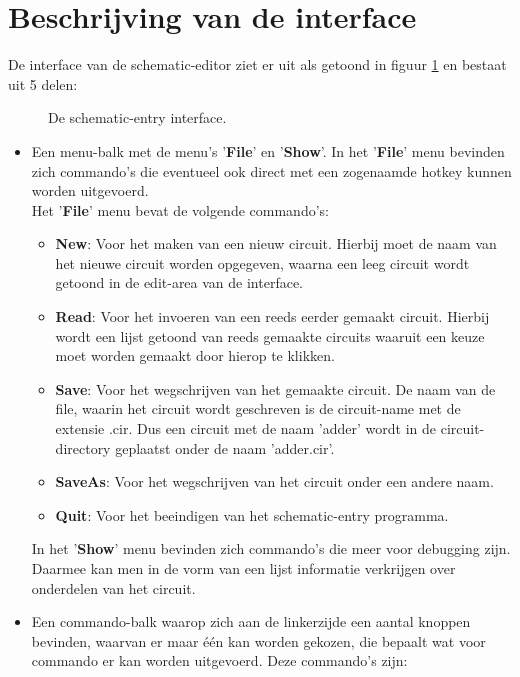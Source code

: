 \section{Beschrijving van de interface}
De interface van de schematic-editor ziet er uit als getoond in figuur \ref{schen-window}
en bestaat uit 5 delen:
\begin{figure}[htb]
  \centerline{}
  \caption{De schematic-entry interface.}
  \label{schen-window}
\end{figure}
\begin{itemize}
\item Een menu-balk met de menu's '{\bf File}' en '{\bf Show}'.
In het '{\bf File}' menu bevinden zich commando's die eventueel ook direct met
een zogenaamde hotkey kunnen worden uitgevoerd.\\
Het '{\bf File}' menu bevat de volgende commando's:
   \begin{itemize}
   \item {\bf New}: Voor het maken van een nieuw circuit. Hierbij moet de naam
               van het nieuwe circuit worden opgegeven, waarna een leeg
               circuit wordt getoond in de edit-area van de interface.
   \item {\bf Read}: Voor het invoeren van een reeds eerder gemaakt circuit.
               Hierbij wordt een lijst getoond van reeds gemaakte circuits
               waaruit een keuze moet worden gemaakt door hierop te klikken.
   \item {\bf Save}: Voor het wegschrijven van het gemaakte circuit. De naam
                van de file, waarin het circuit wordt geschreven is de
                circuit-name met de extensie .cir. Dus een circuit
                met de naam 'adder' wordt in de circuit-directory geplaatst
                onder de naam 'adder.cir'.
   \item {\bf SaveAs}: Voor het wegschrijven van het circuit onder een andere naam.
   \item {\bf Quit}: Voor het beeindigen van het schematic-entry programma.
   \end{itemize}
In het '{\bf Show}' menu bevinden zich commando's die meer voor debugging zijn.
Daarmee kan men in de vorm van een lijst informatie verkrijgen over onderdelen van het circuit.
\item Een commando-balk waarop zich aan de linkerzijde een aantal knoppen
bevinden, waarvan er maar \'e\'en kan worden gekozen,
die bepaalt wat voor commando er kan worden uitgevoerd.
Deze commando's zijn:

\end{itemize}
